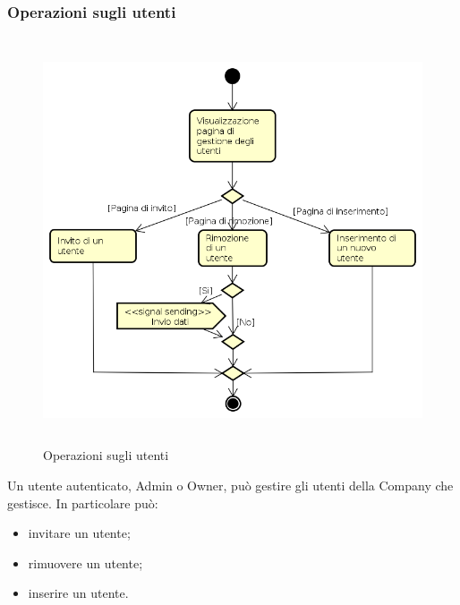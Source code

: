 \subsubsection{Operazioni sugli utenti}
\begin{figure}[H]
\begin{center}
\includegraphics[height=12cm]{res/sections/backend/activities/gestioneUtenti.png}
\caption{Operazioni sugli utenti}
\end{center}
\end{figure}
Un utente autenticato, Admin o Owner, può gestire gli utenti della Company che gestisce. In particolare può:
\begin{itemize}
\item invitare un utente;
\item rimuovere un utente;
\item inserire un utente.
\end{itemize}
\newpage
